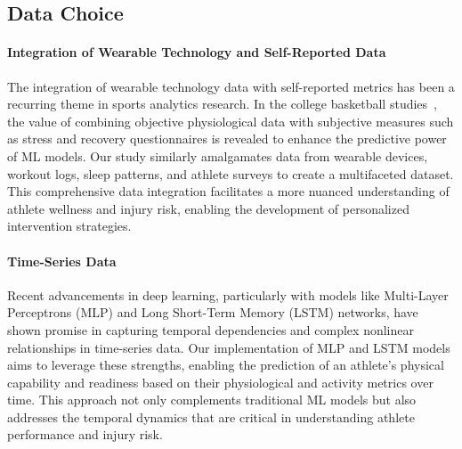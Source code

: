 \documentclass[manuscript,acmsmall,review,screen,authorversion=true]{acmart}
\begin{document}
\subsection{Data Choice }
\paragraph{Integration of Wearable Technology and Self-Reported Data}

The integration of wearable technology data with self-reported metrics has been a recurring theme in sports analytics research. 
In the college basketball studies~\cite{taber2024,zhao2022}, the value of combining objective physiological data with subjective measures such as stress and recovery questionnaires is revealed to enhance the predictive power of ML models. Our study similarly amalgamates data from wearable devices, workout logs, sleep patterns, and athlete surveys to create a multifaceted dataset. This comprehensive data integration facilitates a more nuanced understanding of athlete wellness and injury risk, enabling the development of personalized intervention strategies.

\paragraph{Time-Series Data}
Recent advancements in deep learning, particularly with models like Multi-Layer Perceptrons (MLP) and Long Short-Term Memory (LSTM) networks, have shown promise in capturing temporal dependencies and complex nonlinear relationships in time-series data.
 Our implementation of MLP and LSTM models aims to leverage these strengths, enabling the prediction of an athlete's physical capability and readiness based on their physiological and activity metrics over time. This approach not only complements traditional ML models but also addresses the temporal dynamics that are critical in understanding athlete performance and injury risk.
\end{document}

